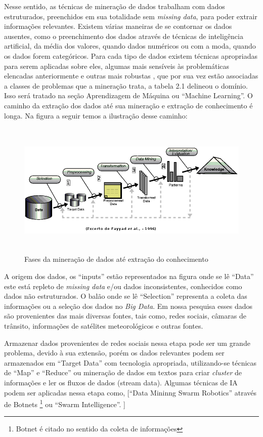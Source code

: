 Nesse sentido, as técnicas de mineração de dados trabalham com dados estruturados, preenchidos em sua totalidade sem \textit{missing data}, para poder extrair informações relevantes.
Existem várias maneiras de se contornar os dados ausentes, como o preenchimento dos dados através de técnicas de inteligência artificial, da média dos valores, quando dados numéricos 
ou com a moda, quando os dados forem categóricos. Para cada tipo de dados existem técnicas apropriadas para serem aplicadas sobre eles, algumas mais sensíveis às problemáticas elencadas anteriormente
e outras mais robustas \cite{DataMining2}, que por sua vez estão associadas a classes de problemas que a mineração trata, a tabela 2.1 delineou o domínio.
Isso será tratado na seção Aprendizagem de Máquina ou ``Machine Learning''.
O caminho da extração dos dados até sua mineração e extração de conhecimento é longa.
Na figura a seguir temos a ilustração desse caminho:

\begin{figure}[!ht]
\centering
\caption{Fases da mineração de dados até extração do conhecimento}
\includegraphics[width=135mm, height=65mm]{Figuras/BigData/FayyadSemFundo.png}
\end{figure}



A origem dos dados, os ``inputs'' estão representados na figura onde se lê ``Data'' este está repleto de \textit{missing data} e/ou dados inconsistentes, conhecidos como dados não estruturados. 
O balão onde se lê ``Selection'' representa a coleta das informações ou a seleção dos dados no \textit{Big Data}.
Em nossa pesquisa esses dados são provenientes das mais diversas fontes, tais como, redes sociais, câmaras de trânsito, informações de satélites meteorológicos e outras fontes.

Armazenar dados provenientes de redes sociais nessa etapa pode ser um grande problema, devido à sua extensão, porém os dados relevantes podem ser armazenados em ``Target Data'' 
com tecnologia apropriada, utilizando-se técnicas de ``Map'' e ``Reduce'' ou mineração de dados em textos para criar \textit{cluster} de informações e ler os fluxos de dados (stream data). 
Algumas técnicas de IA podem ser aplicadas nessa etapa como, [``Data Mininng Swarm Robotics'' através de Botnets \footnote{Botnet é citado no sentido da coleta de informações} ou ``Swarm Intelligence''. ]

